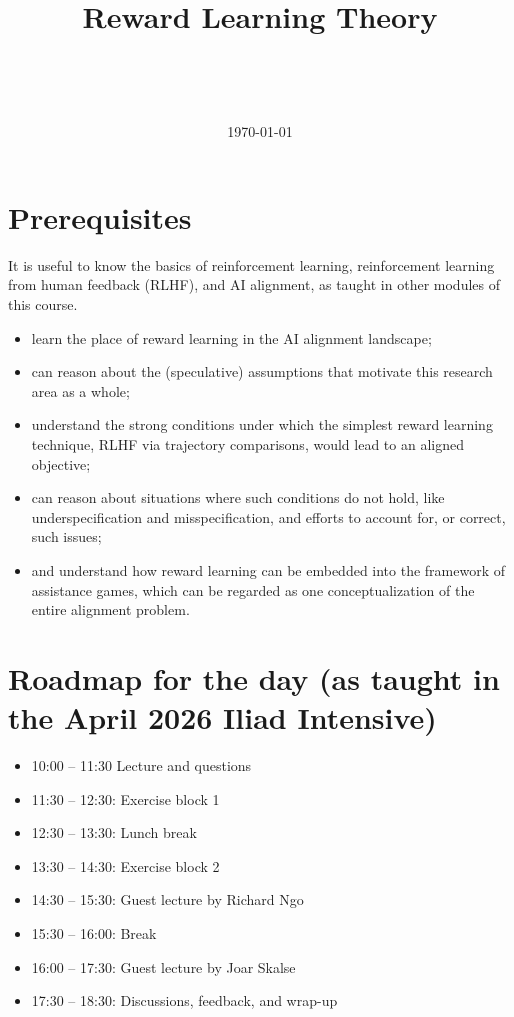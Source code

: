 \documentclass[11pt]{article}
\title{Reward Learning Theory}
\author{
  \authorname{Leon Lang}\\
  \affiliation{Iliad}
  \and
  \authorname{Joar Skalse}\\
  \affiliation{Deducto Limited, King’s College London}
}
\date{\today}
\begin{document}
\maketitle

\section*{Prerequisites}

It is useful to know the basics of reinforcement learning, reinforcement learning from human feedback (RLHF), and AI alignment, as taught in other modules of this course.

\begin{learningoutcomes}
  \begin{itemize}
    \item learn the place of reward learning in the AI alignment landscape;
    \item can reason about the (speculative) assumptions that motivate this research area as a whole;
    \item understand the strong conditions under which the simplest reward learning technique, RLHF via trajectory comparisons, would lead to an aligned objective;
    \item can reason about situations where such conditions do not hold, like underspecification and misspecification, and efforts to account for, or correct, such issues;
    \item and understand how reward learning can be embedded into the framework of assistance games, which can be regarded as one conceptualization of the entire alignment problem.
  \end{itemize}
\end{learningoutcomes}

\section*{Roadmap for the day (as taught in the April 2026 Iliad Intensive)}

\begin{itemize}
  \item 10:00 – 11:30 Lecture and questions
  \item 11:30 – 12:30: Exercise block 1
  \item 12:30 – 13:30: Lunch break
  \item 13:30 – 14:30: Exercise block 2
  \item 14:30 – 15:30: Guest lecture by Richard Ngo
  \item 15:30 – 16:00: Break
  \item 16:00 – 17:30: Guest lecture by Joar Skalse
  \item 17:30 – 18:30: Discussions, feedback, and wrap-up
\end{itemize}
\end{document}
